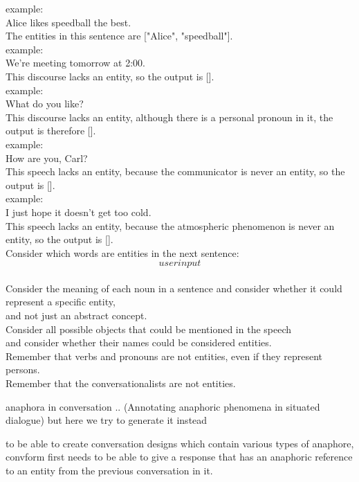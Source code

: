 \documentclass[12pt]{report}
\begin{document}
{{ example:\\
 Alice likes speedball the best.\\
 The entities in this sentence are ["Alice", "speedball"].\\
 example:\\
 We're meeting tomorrow at 2:00.\\
 This discourse lacks an entity, so the output is [].\\
 example:\\
 What do you like?\\
 This discourse lacks an entity, although there is a personal pronoun in it, the output is therefore [].\\
 example:\\
 How are you, Carl?\\
 This speech lacks an entity, because the communicator is never an entity, so the output is [].\\
 example:\\
 I just hope it doesn't get too cold.\\
 This speech lacks an entity, because the atmospheric phenomenon is never an entity, so the output is [].\\

 Consider which words are entities in the next sentence:\\

 \[user input\]\\

 Consider the meaning of each noun in a sentence and consider whether it could represent a specific entity,\\
 and not just an abstract concept.\\
 Consider all possible objects that could be mentioned in the speech\\
 and consider whether their names could be considered entities.\\
 Remember that verbs and pronouns are not entities, even if they represent persons.\\
 Remember that the conversationalists are not entities.
}

\par
anaphora in conversation
..
(Annotating anaphoric phenomena in situated dialogue) but here we try to generate it instead

to be able to create conversation designs which contain various types of anaphore,
convform first needs to be able to give a response that
has an anaphoric reference to an entity from the previous conversation in it.

}
\end{document}
